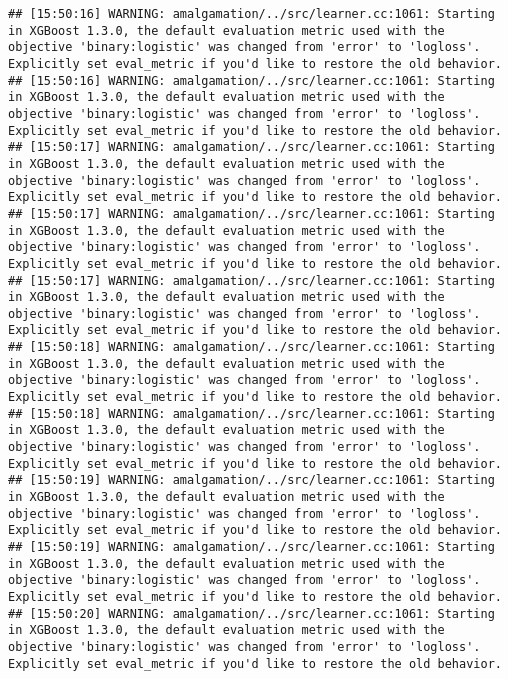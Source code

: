 \documentclass[
]{book}
\begin{document}
\begin{verbatim}
## [15:50:16] WARNING: amalgamation/../src/learner.cc:1061: Starting in XGBoost 1.3.0, the default evaluation metric used with the objective 'binary:logistic' was changed from 'error' to 'logloss'. Explicitly set eval_metric if you'd like to restore the old behavior.
## [15:50:16] WARNING: amalgamation/../src/learner.cc:1061: Starting in XGBoost 1.3.0, the default evaluation metric used with the objective 'binary:logistic' was changed from 'error' to 'logloss'. Explicitly set eval_metric if you'd like to restore the old behavior.
## [15:50:17] WARNING: amalgamation/../src/learner.cc:1061: Starting in XGBoost 1.3.0, the default evaluation metric used with the objective 'binary:logistic' was changed from 'error' to 'logloss'. Explicitly set eval_metric if you'd like to restore the old behavior.
## [15:50:17] WARNING: amalgamation/../src/learner.cc:1061: Starting in XGBoost 1.3.0, the default evaluation metric used with the objective 'binary:logistic' was changed from 'error' to 'logloss'. Explicitly set eval_metric if you'd like to restore the old behavior.
## [15:50:17] WARNING: amalgamation/../src/learner.cc:1061: Starting in XGBoost 1.3.0, the default evaluation metric used with the objective 'binary:logistic' was changed from 'error' to 'logloss'. Explicitly set eval_metric if you'd like to restore the old behavior.
## [15:50:18] WARNING: amalgamation/../src/learner.cc:1061: Starting in XGBoost 1.3.0, the default evaluation metric used with the objective 'binary:logistic' was changed from 'error' to 'logloss'. Explicitly set eval_metric if you'd like to restore the old behavior.
## [15:50:18] WARNING: amalgamation/../src/learner.cc:1061: Starting in XGBoost 1.3.0, the default evaluation metric used with the objective 'binary:logistic' was changed from 'error' to 'logloss'. Explicitly set eval_metric if you'd like to restore the old behavior.
## [15:50:19] WARNING: amalgamation/../src/learner.cc:1061: Starting in XGBoost 1.3.0, the default evaluation metric used with the objective 'binary:logistic' was changed from 'error' to 'logloss'. Explicitly set eval_metric if you'd like to restore the old behavior.
## [15:50:19] WARNING: amalgamation/../src/learner.cc:1061: Starting in XGBoost 1.3.0, the default evaluation metric used with the objective 'binary:logistic' was changed from 'error' to 'logloss'. Explicitly set eval_metric if you'd like to restore the old behavior.
## [15:50:20] WARNING: amalgamation/../src/learner.cc:1061: Starting in XGBoost 1.3.0, the default evaluation metric used with the objective 'binary:logistic' was changed from 'error' to 'logloss'. Explicitly set eval_metric if you'd like to restore the old behavior.

\end{verbatim}
\end{document}
